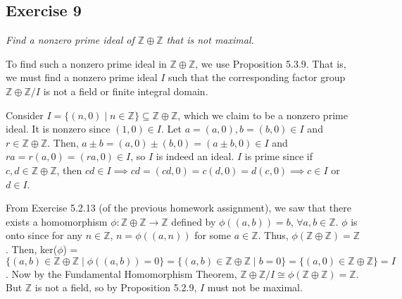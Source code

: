 \subsection*{Exercise 9}
\textit{Find a nonzero prime ideal of $\mathbb{Z}\oplus\mathbb{Z}$ that is not maximal.}

\vspace{5 mm}
To find such a nonzero prime ideal in $\mathbb{Z}\oplus\mathbb{Z}$, we use Proposition 5.3.9. That is, we must find a nonzero prime ideal $I$ such that the corresponding factor group $\mathbb{Z}\oplus\mathbb{Z}/I$ is not a field or finite integral domain.

Consider $I = \{(n,0) \mid n \in \mathbb{Z} \} \subseteq \mathbb{Z}\oplus\mathbb{Z}$, which we claim to be a nonzero prime ideal. It is nonzero since $(1,0) \in I$. Let $a = (a,0), b = (b,0) \in I$ and $r \in \mathbb{Z}\oplus\mathbb{Z}$. Then, $a \pm b = (a,0) \pm (b,0) = (a \pm b, 0) \in I$ and $ra = r(a,0) = (ra,0) \in I$, so $I$ is indeed an ideal. $I$ is prime since if $c,d \in \mathbb{Z}\oplus\mathbb{Z}$, then $cd \in I \implies cd = (cd,0) = c(d,0) = d(c,0) \implies c \in I$ or $d \in I$.

From Exercise 5.2.13 (of the previous homework assignment), we saw that there exists a homomorphism $\phi: \mathbb{Z}\oplus\mathbb{Z} \rightarrow \mathbb{Z}$ defined by $\phi((a,b)) = b$, $\forall a,b \in \mathbb{Z}$. $\phi$ is onto since for any $n \in \mathbb{Z}$, $n = \phi((a,n))$ for some $a \in \mathbb{Z}$. Thus, $\phi(\mathbb{Z}\oplus\mathbb{Z}) = \mathbb{Z}$. Then, ker($\phi$) = $ \{(a,b) \in \mathbb{Z}\oplus\mathbb{Z} \mid \phi((a,b)) = 0 \} = \{(a,b) \in \mathbb{Z}\oplus\mathbb{Z} \mid b = 0 \} = \{(a,0) \in \mathbb{Z}\oplus\mathbb{Z} \} = I$. Now by the Fundamental Homomorphism Theorem, $\mathbb{Z}\oplus\mathbb{Z}/I \cong \phi(\mathbb{Z}\oplus\mathbb{Z}) = \mathbb{Z}$. But $\mathbb{Z}$ is not a field, so by Proposition 5.2.9, $I$ must not be maximal.